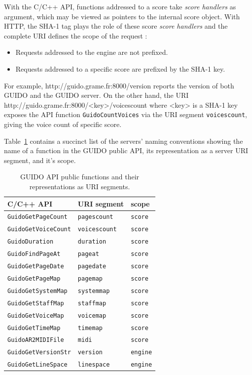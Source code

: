 \documentclass[11pt,a4paper]{article}
\newenvironment{mcode}		{\vspace{-2mm} \fontsize{10pt}{12pt}\selectfont \verbatim}{\endverbatim\vspace{-2mm}}
\begin{document}
With the C/C++ API, functions addressed to a score take \emph{score handlers} as argument, which may be viewed as pointers to the internal score object. With HTTP, the SHA-1 tag plays the role of these score \emph{score handlers} and the complete URI defines the scope of the request :	
\begin{itemize}[noitemsep]
\item Requests addressed to the engine are not prefixed.
\item Requests addressed to a specific score are prefixed by the SHA-1 key.
\end{itemize}
For example,
\begin{mcode}
 http://guido.grame.fr:8000/version
\end{mcode}
reports the version of both GUIDO and the GUIDO server. On the other hand, the URI
\begin{mcode}
 http://guido.grame.fr:8000/<key>/voicescount
        where <key> is a SHA-1 key
\end{mcode}
exposes the API function \verb=GuidoCountVoices= via the URI segment \verb=voicescount=, giving the voice count of specific score.\par
Table~\ref{table:table1} contains a succinct list of the servers' naming conventions showing the name of a function in the GUIDO public API, its representation as a server URI segment, and it's scope.
\begin{table}
\centering
{\small \begin{tabular}{|l|l|l|}\hline
C/C++ API & URI segment & scope \\\hline
\verb=GuidoGetPageCount= & \verb=pagescount= & \verb=score= \\\hline
\verb=GuidoGetVoiceCount= & \verb=voicescount= & \verb=score= \\\hline
\verb=GuidoDuration= & \verb=duration= & \verb=score= \\\hline
\verb=GuidoFindPageAt= & \verb=pageat= & \verb=score= \\\hline
\verb=GuidoGetPageDate= & \verb=pagedate= & \verb=score= \\\hline
\verb=GuidoGetPageMap= & \verb=pagemap= & \verb=score= \\\hline
\verb=GuidoGetSystemMap= & \verb=systemmap= & \verb=score= \\\hline
\verb=GuidoGetStaffMap= & \verb=staffmap= & \verb=score= \\\hline
\verb=GuidoGetVoiceMap= & \verb=voicemap= & \verb=score= \\\hline
\verb=GuidoGetTimeMap= & \verb=timemap= & \verb=score= \\\hline
\verb=GuidoAR2MIDIFile= & \verb=midi= & \verb=score= \\\hline
\verb=GuidoGetVersionStr= & \verb=version= & \verb=engine= \\\hline
\verb=GuidoGetLineSpace= & \verb=linespace= & \verb=engine= \\\hline
\end{tabular}
}
\cprotect\caption{\label{table:table1} GUIDO API public functions and their representations as URI segments.}
\end{table}
\end{document}
